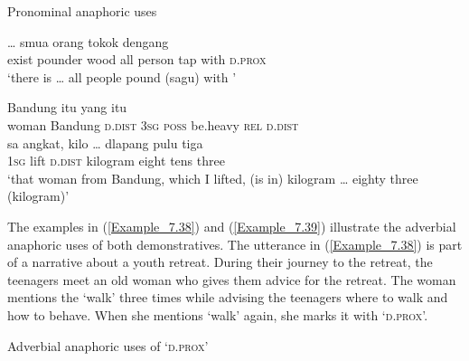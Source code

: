 {\begin{styleExampleTitle}
Pronominal anaphoric uses
\end{styleExampleTitle}

\ea
\label{Example_7.36}
 {} {} {\ldots} {smua} {orang} {tokok} {dengang} {}\\ %
 exist  pounder  wood   {}  all  person  tap  with  \textsc{d.prox}\\
\glt 
‘there is  {\ldots} all people pound (sagu) with ’ \textstyleExampleSource{[081014-006-CvPr.0011/0057]}
\z

\ea
\label{Example_7.37}
 {{Bandung}} {{itu}} {{}} {{}} {{}} {yang} {itu}\\ %
 {woman}  {Bandung}  {\textsc{d.dist}}  {\textsc{3sg}}  {\textsc{poss}}  {be.heavy}  \textsc{rel}  \textsc{d.dist}\\
\gll  sa  {angkat,}  {}  {kilo}  {\ldots}  {dlapang}  pulu  {tiga}\\
 \textsc{1sg}  {lift}  {\textsc{d.dist}}  {kilogram}  { }  {eight}  tens  {three}\\
\glt 
‘that woman from Bandung,  which I lifted,  (is in) kilogram {\ldots} eighty three (kilogram)’ \textstyleExampleSource{[081023-003-Cv.0003]}
\z



The examples in (\ref{Example_7.38}) and (\ref{Example_7.39}) illustrate the adverbial anaphoric uses of both demonstratives. The utterance in (\ref{Example_7.38}) is part of a narrative about a youth retreat. During their journey to the retreat, the teenagers meet an old woman who gives them advice for the retreat. The woman mentions the   ‘walk’ three times while advising the teenagers where to walk and how to behave. When she mentions  ‘walk’ again, she marks it with  ‘\textsc{d.prox}’.


\begin{styleExampleTitle}
Adverbial anaphoric uses of  ‘\textsc{d.prox}’
\end{styleExampleTitle}

}
